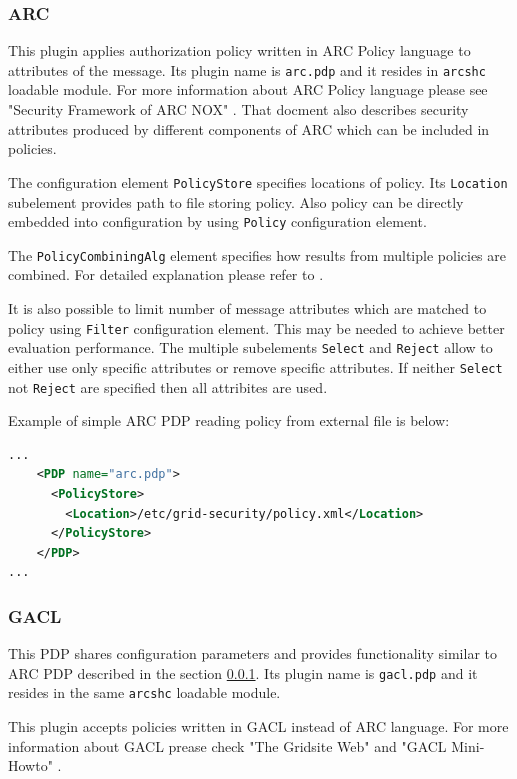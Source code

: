 \documentclass{article}
\begin{document}
\subsubsection{ARC}\label{sec:arc-pdp}
This plugin applies authorization policy written in ARC Policy language to attributes
of the message. Its plugin name is \texttt{arc.pdp} and it resides in \texttt{arcshc}
loadable module. For more information about ARC Policy language please see "Security 
Framework of ARC NOX" \cite{arc1-sec}. That docment also describes security
attributes produced by different components of ARC which can be included in policies.

The configuration element \texttt{PolicyStore} specifies locations of policy. Its
\texttt{Location} subelement provides path to file storing policy. Also policy can be 
directly embedded into configuration by using \texttt{Policy} configuration element.

The \texttt{PolicyCombiningAlg} element specifies how results from multiple policies
are combined. For detailed explanation please refer to \cite{arc1-sec}.

It is also possible to limit number of message attributes which are matched to policy
using \texttt{Filter} configuration element. This may be needed to achieve better
evaluation performance. The multiple subelements \texttt{Select} and \texttt{Reject}
allow to either use only specific attributes or remove specific attributes. If neither 
\texttt{Select} not \texttt{Reject} are specified then all attribites are used.

Example of simple ARC PDP reading policy from external file is below:
\begin{lstlisting}[language=xml]
...
    <PDP name="arc.pdp">
      <PolicyStore>
        <Location>/etc/grid-security/policy.xml</Location>
      </PolicyStore>
    </PDP>
...
\end{lstlisting}


\subsubsection{GACL}\label{gacl-pdp}
This PDP shares configuration parameters and provides functionality similar to ARC PDP
described in the section \ref{sec:arc-pdp}. Its plugin name is \texttt{gacl.pdp} and it
resides in the same \texttt{arcshc} loadable module.

This plugin accepts policies written in GACL instead of ARC language. For more information
about GACL prease check "The Gridsite Web" \cite{gacl} and "GACL Mini-Howto" \cite{gacl-mini}.
\end{document}
